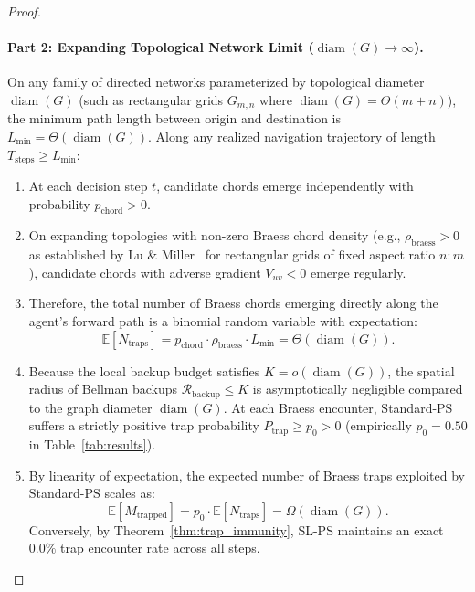 \documentclass[11pt,a4paper]{article}
\begin{document}
\begin{proof}
\paragraph{Part 2: Expanding Topological Network Limit ($\operatorname{diam}(G) \to \infty$).}
On any family of directed networks parameterized by topological diameter $\operatorname{diam}(G)$ (such as rectangular grids $G_{m,n}$ where $\operatorname{diam}(G) = \Theta(m+n)$), the minimum path length between origin and destination is $L_{\min} = \Theta(\operatorname{diam}(G))$. Along any realized navigation trajectory of length $T_{\text{steps}} \ge L_{\min}$:
\begin{enumerate}
    \item At each decision step $t$, candidate chords emerge independently with probability $p_{\text{chord}} > 0$.
    \item On expanding topologies with non-zero Braess chord density (e.g., $\rho_{\text{braess}} > 0$ as established by Lu \& Miller~\cite{lu2026braess} for rectangular grids of fixed aspect ratio $n : m$), candidate chords with adverse gradient $V_{uv} < 0$ emerge regularly.
    \item Therefore, the total number of Braess chords emerging directly along the agent's forward path is a binomial random variable with expectation:
    \begin{equation}
    \mathbb{E}[N_{\text{traps}}] = p_{\text{chord}} \cdot \rho_{\text{braess}} \cdot L_{\min} = \Theta(\operatorname{diam}(G)).
    \end{equation}
    \item Because the local backup budget satisfies $K = o(\operatorname{diam}(G))$, the spatial radius of Bellman backups $\mathcal{R}_{\text{backup}} \le K$ is asymptotically negligible compared to the graph diameter $\operatorname{diam}(G)$. At each Braess encounter, Standard-PS suffers a strictly positive trap probability $P_{\text{trap}} \ge p_0 > 0$ (empirically $p_0 = 0.50$ in Table~\ref{tab:results}).
    \item By linearity of expectation, the expected number of Braess traps exploited by Standard-PS scales as:
    \begin{equation}
    \mathbb{E}[M_{\text{trapped}}] = p_0 \cdot \mathbb{E}[N_{\text{traps}}] = \Omega(\operatorname{diam}(G)).
    \end{equation}
    Conversely, by Theorem~\ref{thm:trap_immunity}, SL-PS maintains an exact $0.0\%$ trap encounter rate across all steps.
\end{enumerate}


\end{proof}
\end{document}
